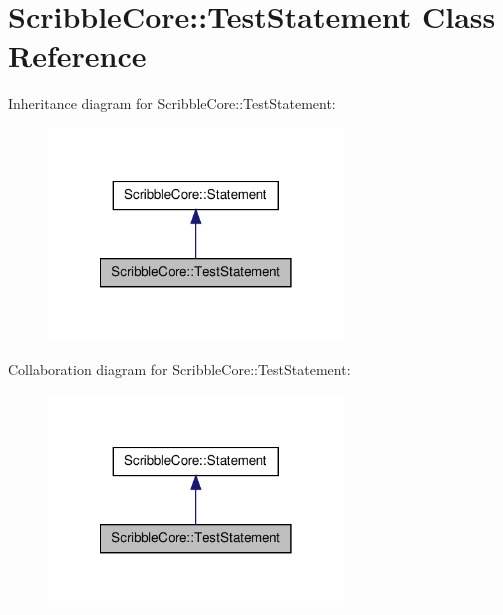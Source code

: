 \hypertarget{class_scribble_core_1_1_test_statement}{\section{Scribble\-Core\-:\-:Test\-Statement Class Reference}
\label{class_scribble_core_1_1_test_statement}
}


Inheritance diagram for Scribble\-Core\-:\-:Test\-Statement\-:\nopagebreak
\begin{figure}[H]
\begin{center}
\leavevmode
\includegraphics[width=222pt]{class_scribble_core_1_1_test_statement__inherit__graph}
\end{center}
\end{figure}


Collaboration diagram for Scribble\-Core\-:\-:Test\-Statement\-:\nopagebreak
\begin{figure}[H]
\begin{center}
\leavevmode
\includegraphics[width=222pt]{class_scribble_core_1_1_test_statement__coll__graph}
\end{center}
\end{figure}
